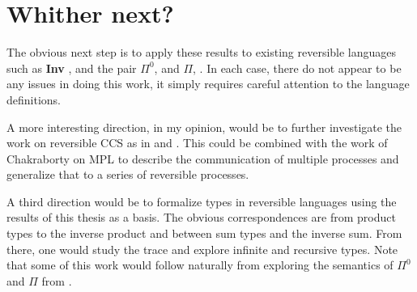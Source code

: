 \section{Whither next?}
\label{sec:whither-next}

The obvious next step is to apply these results to existing reversible languages such as
\textbf{Inv} \cite{muetal04:injreversible}, and the pair $\Pi^0$, \cite{james2013isomorphic} and $\Pi$,
\cite{james2012information}. In each case, there do not appear to be any issues in doing this work,
it simply requires careful attention to the language definitions.

A more interesting direction, in my opinion, would be to further investigate the work on reversible
CCS as in \cite{danos2004reversible} and \cite{phillips2006operational}. This could be combined with
the work of Chakraborty on MPL \cite{chakraborty2014} to describe the communication of multiple
processes and generalize that to a series of reversible processes.

A third direction would be to formalize types in reversible languages using the results of this
thesis as a basis. The obvious correspondences are from product types to the inverse product and
between sum types and the inverse sum. From there, one would study the trace and explore infinite
and recursive types. Note that some of this work would follow naturally from exploring the semantics
of $\Pi^0$ and $\Pi$ from \cite{james2013isomorphic,james2012information}.



